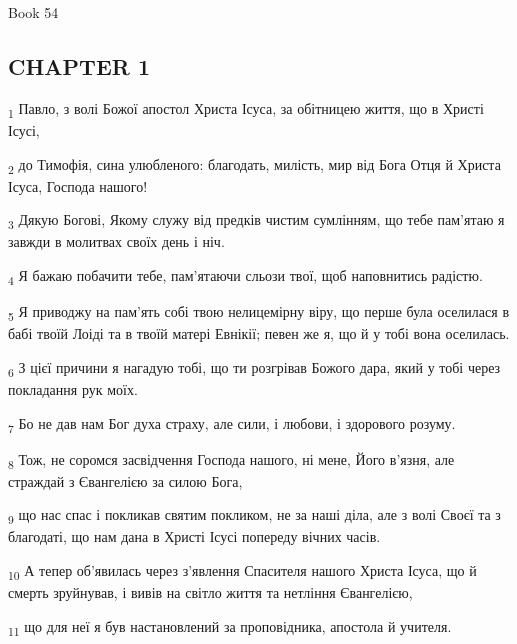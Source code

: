 Book 54
\subsection{CHAPTER 1}
\begin{tcolorbox}
\textsubscript{1} Павло, з волі Божої апостол Христа Ісуса, за обітницею життя, що в Христі Ісусі,
\end{tcolorbox}
\begin{tcolorbox}
\textsubscript{2} до Тимофія, сина улюбленого: благодать, милість, мир від Бога Отця й Христа Ісуса, Господа нашого!
\end{tcolorbox}
\begin{tcolorbox}
\textsubscript{3} Дякую Богові, Якому служу від предків чистим сумлінням, що тебе пам'ятаю я завжди в молитвах своїх день і ніч.
\end{tcolorbox}
\begin{tcolorbox}
\textsubscript{4} Я бажаю побачити тебе, пам'ятаючи сльози твої, щоб наповнитись радістю.
\end{tcolorbox}
\begin{tcolorbox}
\textsubscript{5} Я приводжу на пам'ять собі твою нелицемірну віру, що перше була оселилася в бабі твоїй Лоіді та в твоїй матері Евнікії; певен же я, що й у тобі вона оселилась.
\end{tcolorbox}
\begin{tcolorbox}
\textsubscript{6} З цієї причини я нагадую тобі, що ти розгрівав Божого дара, який у тобі через покладання рук моїх.
\end{tcolorbox}
\begin{tcolorbox}
\textsubscript{7} Бо не дав нам Бог духа страху, але сили, і любови, і здорового розуму.
\end{tcolorbox}
\begin{tcolorbox}
\textsubscript{8} Тож, не соромся засвідчення Господа нашого, ні мене, Його в'язня, але страждай з Євангелією за силою Бога,
\end{tcolorbox}
\begin{tcolorbox}
\textsubscript{9} що нас спас і покликав святим покликом, не за наші діла, але з волі Своєї та з благодаті, що нам дана в Христі Ісусі попереду вічних часів.
\end{tcolorbox}
\begin{tcolorbox}
\textsubscript{10} А тепер об'явилась через з'явлення Спасителя нашого Христа Ісуса, що й смерть зруйнував, і вивів на світло життя та нетління Євангелією,
\end{tcolorbox}
\begin{tcolorbox}
\textsubscript{11} що для неї я був настановлений за проповідника, апостола й учителя.
\end{tcolorbox}
